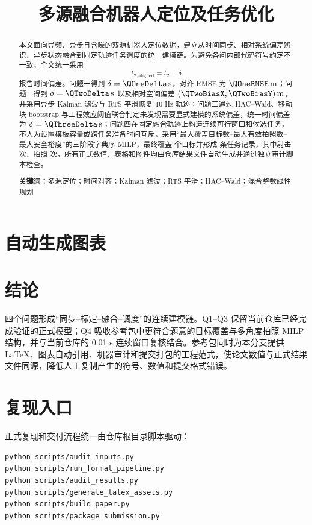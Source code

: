 \documentclass[UTF8,12pt,a4paper]{ctexart}
\title{多源融合机器人定位及任务优化}
\author{}
\date{}
\begin{document}
\maketitle

\begin{abstract}
本文面向异频、异步且含噪的双源机器人定位数据，建立从时间同步、相对系统偏差辨识、异步状态融合到固定轨迹任务调度的统一建模链。为避免各问内部代码符号约定不一致，全文统一采用
\[
  t_{2,\mathrm{aligned}}=t_2+\delta
\]
报告时间偏差。问题一得到 $\delta=\QOneDelta\,\mathrm{s}$，对齐 RMSE 为 $\QOneRMSE\,\mathrm{m}$；问题二得到 $\delta=\QTwoDelta\,\mathrm{s}$ 以及相对空间偏差 $(\QTwoBiasX,\QTwoBiasY)\,\mathrm{m}$，并采用异步 Kalman 滤波与 RTS 平滑恢复 10 Hz 轨迹；问题三通过 HAC--Wald、移动块 bootstrap 与工程效应阈值联合判定未发现需要显式建模的系统偏差，统一时间偏差为 $\delta=\QThreeDelta\,\mathrm{s}$；问题四在固定融合轨迹上构造连续可行窗口和候选任务，不人为设置模板容量或跨任务准备时间互斥，采用“最大覆盖目标数--最大有效拍照数--最大安全裕度”的三阶段字典序 MILP，最终覆盖 \QFourCoverageCount 个目标并形成 \QFourTaskCount 条任务记录，其中射击 \QFourShootCount 次、拍照 \QFourPhotoCount 次。所有正式数值、表格和图件均由仓库结果文件自动生成并通过独立审计脚本检查。

\noindent\textbf{关键词：}多源定位；时间对齐；Kalman 滤波；RTS 平滑；HAC--Wald；混合整数线性规划
\end{abstract}

\tableofcontents
\clearpage








\section{自动生成图表}


\section{结论}
四个问题形成“同步--标定--融合--调度”的连续建模链。Q1--Q3 保留当前仓库已经完成验证的正式模型；Q4 吸收参考包中更符合题意的目标覆盖与多角度拍照 MILP 结构，并与当前仓库的 0.01 s 连续窗口复核结合。参考包同时为本分支提供 LaTeX、图表自动引用、机器审计和提交打包的工程范式，使论文数值与正式结果文件同源，降低人工复制产生的符号、数值和提交格式错误。

\appendix
\section{复现入口}
正式复现和交付流程统一由仓库根目录脚本驱动：
\begin{lstlisting}
python scripts/audit_inputs.py
python scripts/run_formal_pipeline.py
python scripts/audit_results.py
python scripts/generate_latex_assets.py
python scripts/build_paper.py
python scripts/package_submission.py
\end{lstlisting}
\end{document}
